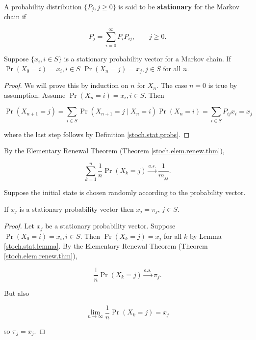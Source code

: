 \begin{definition} A probability distribution \(\{P_j, j \geq 0\}\) is said to be \textbf{stationary} for the Markov chain if

\[
P_j = \sum_{i=0}^\infty P_i P_{ij}, \qquad j \geq 0.
\]

\end{definition}

\begin{lemma}\label{stoch.stat.lemma}Suppose \(\{x_i, i \in S\}\) is a stationary probability vector for a Markov chain. If \(\Pr(X_0 = i) = x_i, i \in S\) \(\Pr(X_n = j) = x_j, j \in S\) for all \(n\).

\end{lemma}

\begin{proof} We will prove this by induction on \(n\) for \(X_n\). The case \(n=0\) is true by assumption. Assume \(\Pr(X_n = i) = x_i, i \in S\). Then

\[
\Pr(X_{n+1} = j) = \sum_{i \in S} \Pr(X_{n+1} = j \mid X_n = i) \Pr(X_n = i)   = \sum_{i \in S} P_{ij} x_i = x_j
\]

where the last step follows by Definition \ref{stoch.stat.probs}.
\end{proof}

By the Elementary Renewal Theorem (Theorem \ref{stoch.elem.renew.thm}),

\[
\sum_{k=1}^n \frac{1}{n} \Pr(X_k = j) \xrightarrow{a.s.} \frac{1}{m_{jj}}.
\]

Suppose the initial state is chosen randomly according to the probability vector. 

\begin{proposition} If \(x_j\) is a stationary probability vector then \(x_j = \pi_j\), \(j \in S\).

\end{proposition}

\begin{proof}Let \(x_j\) be a stationary probability vector. Suppose \(\Pr(X_0 = i) = x_i, i \in S\). Then \(\Pr(X_k = j) = x_j\) for all \(k\) by Lemma \ref{stoch.stat.lemma}. By the Elementary Renewal Theorem (Theorem \ref{stoch.elem.renew.thm}),

\[
\frac{1}{n} \Pr(X_k = j) \xrightarrow{a.s.} \pi_j.
\]

But also

\[
\lim_{n \to \infty} \frac{1}{n} \Pr(X_k = j) = x_j
\]

so \(\pi_j = x_j\).

\end{proof}

